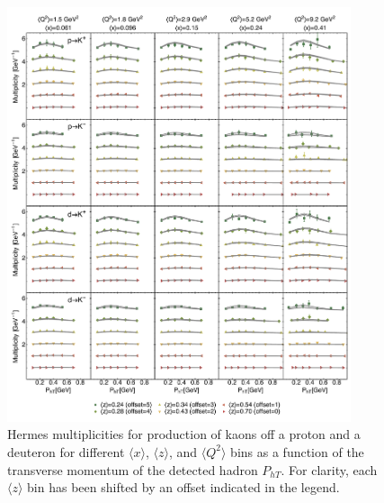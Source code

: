 \documentclass[aps,preprintnumbers,showpacs,nofootinbib,superscriptaddress,floatfix]{revtex4}
\begin{document}
\begin{figure}[h!]
\begin{center}
\includegraphics[width=0.90\textwidth]{plots/Hermes_Kaons_SCIplot_flINDEP.pdf}
\end{center}
\caption{Hermes multiplicities for production of kaons off a proton and a deuteron for different $\langle x \rangle$, $\langle z \rangle$, and $\langle Q^2 \rangle$ bins as a function of the transverse momentum of the detected hadron $P_{hT}$. For clarity, each $\langle z \rangle$  bin has been shifted by an offset indicated in the legend.} 
\label{f:H_kaons}
\end{figure}
\end{document}
